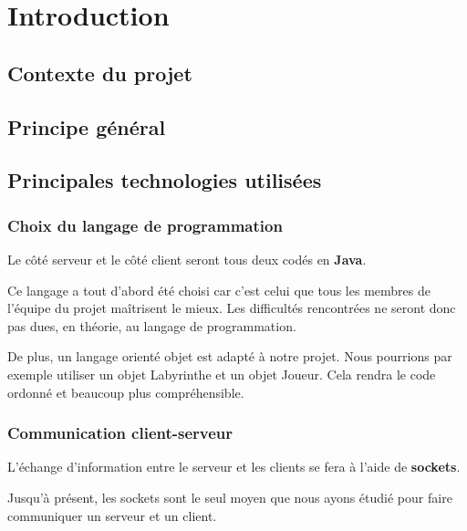 \chapter{Introduction}

\section{Contexte du projet}


\section{Principe général}


\section{Principales technologies utilisées}
\subsection{Choix du langage de programmation}
Le côté serveur et le côté client seront tous deux codés en \textbf{Java}.

Ce langage a tout d'abord été choisi car c'est celui que tous les membres de l'équipe du projet maîtrisent le mieux. Les difficultés rencontrées ne seront donc pas dues, en théorie, au langage de programmation.

De plus, un langage orienté objet est adapté à notre projet. Nous pourrions par exemple utiliser un objet Labyrinthe et un objet Joueur. Cela rendra le code ordonné et beaucoup plus compréhensible.

\subsection{Communication client-serveur}
L'échange d'information entre le serveur et les clients se fera à l'aide de \textbf{sockets}.

Jusqu'à présent, les sockets sont le seul moyen que nous ayons étudié pour faire communiquer un serveur et un client.

